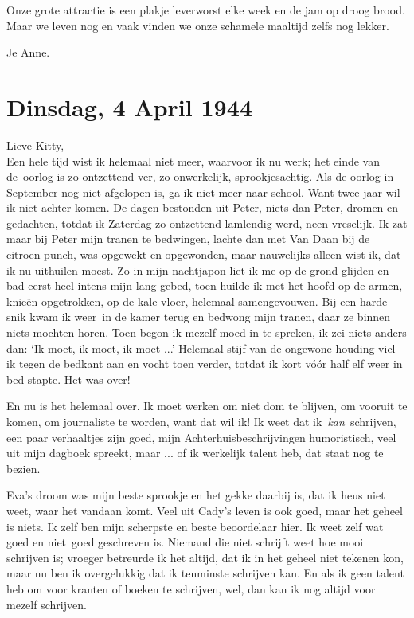 \documentclass{book}
\begin{document}
Onze grote attractie is een plakje leverworst elke week en de jam op droog
brood. Maar we leven nog en vaak vinden we onze schamele maaltijd zelfs nog
lekker.

Je Anne.

\section*{Dinsdag, 4 April 1944}

Lieve Kitty,\\
Een hele tijd wist ik helemaal niet meer, waarvoor ik nu werk;
het einde van de~oorlog is zo ontzettend ver, zo onwerkelijk, sprookjesachtig.
Als de oorlog in September nog niet afgelopen is, ga ik niet meer naar school.
Want twee jaar wil ik niet achter komen. De dagen bestonden uit Peter, niets dan
Peter, dromen en gedachten, totdat ik Zaterdag zo ontzettend lamlendig werd,
neen vreselijk. Ik zat maar bij Peter mijn tranen te bedwingen, lachte dan met
Van Daan bij de citroen-punch, was opgewekt en opgewonden, maar nauwelijks
alleen wist ik, dat ik nu uithuilen moest. Zo in mijn nachtjapon liet ik me op
de grond glijden en bad eerst heel intens mijn lang gebed, toen huilde ik met
het hoofd op de armen, knieën opgetrokken, op de kale vloer, helemaal
samengevouwen. Bij een harde snik kwam ik weer~in de kamer terug en bedwong mijn
tranen, daar ze binnen niets mochten horen. Toen begon ik mezelf moed in te
spreken, ik zei niets anders dan: `Ik moet, ik moet, ik moet ...' Helemaal stijf
van de ongewone houding viel ik tegen de bedkant aan en vocht toen verder,
totdat ik kort vóór half elf weer in bed stapte. Het was over!

En nu is het helemaal over. Ik moet werken om niet dom te blijven, om vooruit te
komen, om journaliste te worden, want dat wil ik! Ik weet dat
ik~\emph{kan}~schrijven, een paar verhaaltjes zijn goed, mijn
Achterhuisbeschrijvingen humoristisch, veel uit mijn dagboek spreekt, maar ...
of ik werkelijk talent heb, dat staat nog te bezien.

Eva's droom was mijn beste sprookje en het gekke daarbij is, dat ik heus niet
weet, waar het vandaan komt. Veel uit Cady's leven is ook goed, maar het geheel
is niets. Ik zelf ben mijn scherpste en beste beoordelaar hier. Ik weet zelf wat
goed en niet~goed geschreven is.  Niemand die niet schrijft weet hoe mooi
schrijven is; vroeger betreurde ik het altijd, dat ik in het geheel niet tekenen
kon, maar nu ben ik overgelukkig dat ik tenminste schrijven kan. En als ik geen
talent heb om voor kranten of boeken te schrijven, wel, dan kan ik nog altijd
voor mezelf schrijven.
\end{document}

